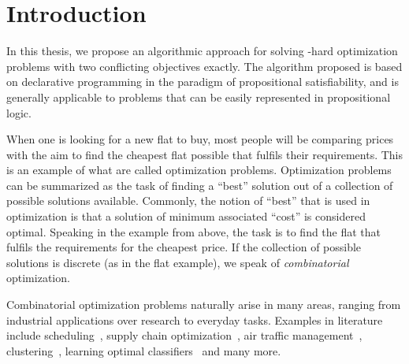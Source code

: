 \chapter{Introduction\label{chap:intro}}

In this thesis, we propose an algorithmic approach for solving \NP-hard optimization problems with two conflicting objectives exactly.
The algorithm proposed is based on declarative programming in the paradigm of propositional satisfiability, and is generally applicable to problems that can be easily represented in propositional logic.

When one is looking for a new flat to buy, most people will be comparing prices with the aim to find the cheapest flat possible that fulfils their requirements.
This is an example of what are called optimization problems.
Optimization problems can be summarized as the task of finding a ``best'' solution out of a collection of possible solutions available.
Commonly, the notion of ``best'' that is used in optimization is that a solution of minimum associated ``cost'' is considered optimal.
Speaking in the example from above, the task is to find the flat that fulfils the requirements for the cheapest price.
If the collection of possible solutions is discrete (as in the flat example), we speak of \emph{combinatorial} optimization.

Combinatorial optimization problems naturally arise in many areas, ranging from industrial applications over research to everyday tasks.
Examples in literature include scheduling~\autocites{DBLP:conf/cp/Stojadinovic14,DBLP:conf/cpaior/BofillGSV15,DBLP:journals/ior/Solomon87,DBLP:journals/candie/AkyolB07}, supply chain optimization~\autocite{DBLP:journals/cce/Papageorgiou09}, air traffic management~\autocites{DBLP:journals/ior/BertsimasLO11,RichardsHow2002Aircrafttrajectoryplanning}, clustering~\autocite{DBLP:journals/ai/DaoDV17,DBLP:conf/sdm/DavidsonRS10}, learning optimal classifiers~\autocites{DBLP:conf/cp/MaliotovM18,DBLP:conf/ijcai/NarodytskaIPM18,DBLP:conf/ijcai/Hu0HH20,DBLP:conf/cp/YuISB20,DBLP:conf/aaai/DemirovicS21,DBLP:conf/cp/ShatiCM21,DBLP:conf/cade/IgnatievPNM18} and many more.

